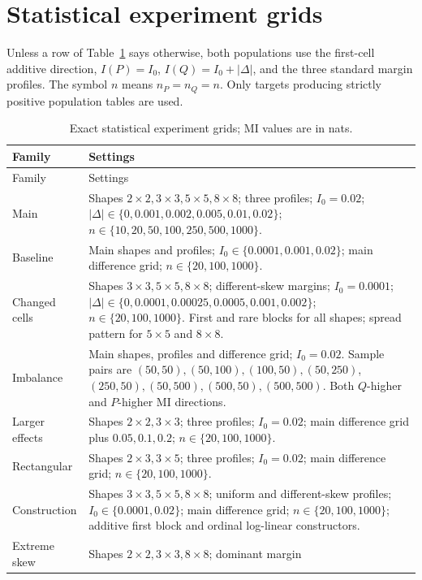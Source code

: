 \section{Statistical experiment grids}

Unless a row of Table~\ref{tab:exact-grids} says otherwise, both populations
use the first-cell additive direction, \(I(P)=I_0\),
\(I(Q)=I_0+|\Delta|\), and the three standard margin profiles. The
symbol \(n\) means \(n_P=n_Q=n\). Only targets producing strictly positive
population tables are used.

\begin{longtable}{@{}p{}p{}@{}}
\caption{Exact statistical experiment grids; MI values are in nats.}
\label{tab:exact-grids}\\
\toprule
Family & Settings\\
\midrule
\endfirsthead
\toprule
Family & Settings\\
\midrule
\endhead
Main & Shapes \(2\times2,3\times3,5\times5,8\times8\); three profiles;
\(I_0=0.02\); \(|\Delta|\in\{0,0.001,0.002,0.005,0.01,0.02\}\);
\(n\in\{10,20,50,100,250,500,1000\}\).\\
Baseline & Main shapes and profiles; \(I_0\in\{0.0001,0.001,0.02\}\);
main difference grid; \(n\in\{20,100,1000\}\).\\
Changed cells & Shapes \(3\times3,5\times5,8\times8\);
different-skew margins; \(I_0=0.0001\);
\(|\Delta|\in\{0,0.0001,0.00025,0.0005,0.001,0.002\}\);
\(n\in\{20,100,1000\}\). First and rare blocks for all shapes;
spread pattern for \(5\times5\) and \(8\times8\).\\
Imbalance & Main shapes, profiles and difference grid;
\(I_0=0.02\). Sample pairs are
\((50,50),(50,100),(100,50),(50,250)\),
\((250,50),(50,500),(500,50),(500,500)\).
Both \(Q\)-higher and \(P\)-higher MI directions.\\
Larger effects & Shapes \(2\times2,3\times3\); three profiles;
\(I_0=0.02\); main difference grid plus \(0.05,0.1,0.2\);
\(n\in\{20,100,1000\}\).\\
Rectangular & Shapes \(2\times3,3\times5\); three profiles;
\(I_0=0.02\); main difference grid;
\(n\in\{20,100,1000\}\).\\
Construction & Shapes \(3\times3,5\times5,8\times8\); uniform and
different-skew profiles; \(I_0\in\{0.0001,0.02\}\); main difference
grid; \(n\in\{20,100,1000\}\); additive first block and ordinal
log-linear constructors.\\
Extreme skew & Shapes \(2\times2,3\times3,8\times8\); dominant margin

\end{longtable}

